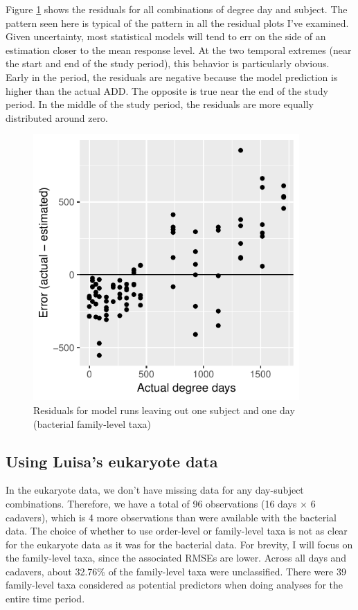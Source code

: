 \documentclass{article}
\begin{document}
Figure \ref{fig:leave_one_out_resids_bac_family_taxa} shows the
residuals for all combinations of degree day and subject.  The pattern
seen here is typical of the pattern in all the residual plots I've
examined.  Given uncertainty, most statistical models will tend to err
on the side of an estimation closer to the mean response level.  At
the two temporal extremes (near the start and end of the study
period), this behavior is particularly obvious.  Early in the period,
the residuals are negative because the model prediction is higher than
the actual ADD.  The opposite is true near the end of the study
period.  In the middle of the study period, the residuals are more
equally distributed around zero.
\begin{figure}
  \centering
  \includegraphics[width=4in]{../revise_algorithm/only_families/all_time_steps/hit_1perc_twice/leave_out_one_subj_and_one_day_residuals}
  \caption{Residuals for model runs leaving out one subject and one day (bacterial family-level taxa)}
  \label{fig:leave_one_out_resids_bac_family_taxa}
\end{figure}


\subsection{Using Luisa's eukaryote data}

In the eukaryote data, we don't have missing data for any day-subject
combinations.  Therefore, we have a total of 96 observations (16 days
$\times$ 6 cadavers), which is 4 more observations than were available
with the bacterial data.  The choice of whether to use order-level or
family-level taxa is not as clear for the eukaryote data as it was for
the bacterial data.  For brevity, I will focus on the family-level
taxa, since the associated RMSEs are lower.  Across all days and
cadavers, about 32.76\% of the family-level taxa were unclassified.
There were 39 family-level taxa considered as potential predictors
when doing analyses for the entire time period.
\end{document}
